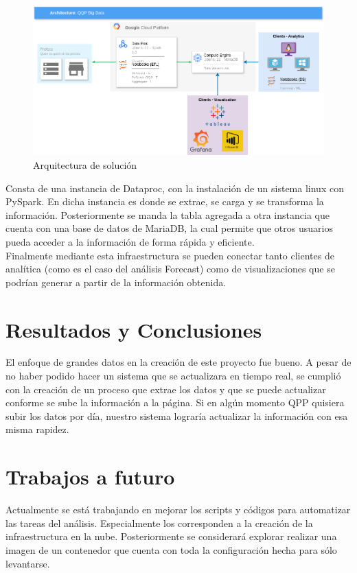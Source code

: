 \documentclass{article}
\begin{document}
\begin{figure}[h]
\centering
\includegraphics[width=0.7\linewidth]{images/Architecture_QQP_BD.png}
\caption{\label{fig:Architecture}Arquitectura de solución}
\end{figure}

Consta de una instancia de Dataproc, con la instalación de un sistema linux con PySpark. En dicha instancia es donde se extrae, se carga y se transforma la información. Posteriormente se manda la tabla agregada a otra instancia que cuenta con una base de datos de MariaDB, la cual permite que otros usuarios pueda acceder a la información de forma rápida y eficiente. \\

Finalmente mediante esta infraestructura se pueden conectar tanto clientes de analítica (como es el caso del análisis Forecast) como de visualizaciones que se podrían generar a partir de la información obtenida.

\section{Resultados y Conclusiones}

El enfoque de grandes datos en la creación de este proyecto fue bueno. A pesar de no haber podido hacer un sistema que se actualizara en tiempo real, se cumplió con la creación de un proceso que extrae los datos y que se puede actualizar conforme se sube la información a la página. Si en algún momento QPP quisiera subir los datos por día, nuestro sistema lograría actualizar la información con esa misma rapidez.

\section{Trabajos a futuro}

Actualmente se está trabajando en mejorar los scripts y códigos para automatizar las tareas del análisis. Especialmente los corresponden a la creación de la infraestructura en la nube. Posteriormente se considerará explorar realizar una imagen de un contenedor que cuenta con toda la configuración hecha para sólo levantarse. \\
\end{document}
